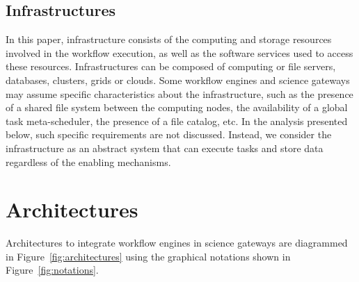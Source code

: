 \documentclass[preprint,3p,twocolumn]{elsarticle}
\newcommand{\note}[2]{\pdfmargincomment[color=yellow,author=#1,open=true]{#2}}
\newcommand{\closednote}[4]{} %
\begin{document}
\subsection{Infrastructures}

In this paper, infrastructure consists of the computing and storage
resources involved in the workflow execution, as well as the software
services used to access these resources. Infrastructures can be composed of
computing or file servers, databases, clusters, grids or clouds. Some
workflow engines and science gateways may assume specific
characteristics about the infrastructure, such as the presence of a
shared file system between the computing nodes, the availability of a
global task meta-scheduler, the presence of a file catalog, etc. In
the analysis presented below, such specific requirements are not
discussed. Instead, we consider the infrastructure as an abstract
system that can execute tasks and store data regardless of the
enabling mechanisms.

\section{Architectures}
\label{sec:architectures}

Architectures to integrate workflow engines in science gateways are
diagrammed in Figure~\ref{fig:architectures} using the graphical
notations shown in Figure~\ref{fig:notations}.  \closednote{Marc-e}{A
  few things bother me a bit with the notation fig., making it harder
  to assimilate 1- The interactions are padded in the middle of other
  stuff (Administrator, Data) 2- The Software component example says
  "Science gateway", should it not be empty?  3- The red arrow to
  explain the use of red; it looks like a very specific type of
  interactions instead of the desired "any interactions or components
  can be red meaning...", especially with 'a' and 'd' which the reader
  does not know the meaning yet.  Maybe a little red arrow and square
  with "Red used when specific to workflow execution"?  I don't have a
  great solution...  Red has special meaning, maybe remove it from the
  other pics (workflow eng, tasks) as it creates lots of visual
  interference when looking for red?  4- Order in text jumps all over
  the fig notations. Explanations are given for, in order: Components,
  workflow engine, interactions, abstract interactions, red color,
  tasks, data (no Administrator?)...  Could re-ordering the fig fix
  this? A figure figure legend could go a long way too (are there some
  in this journal?)  }{Tristan}{Marc-E, is Figure 1 better now?}
\end{document}
